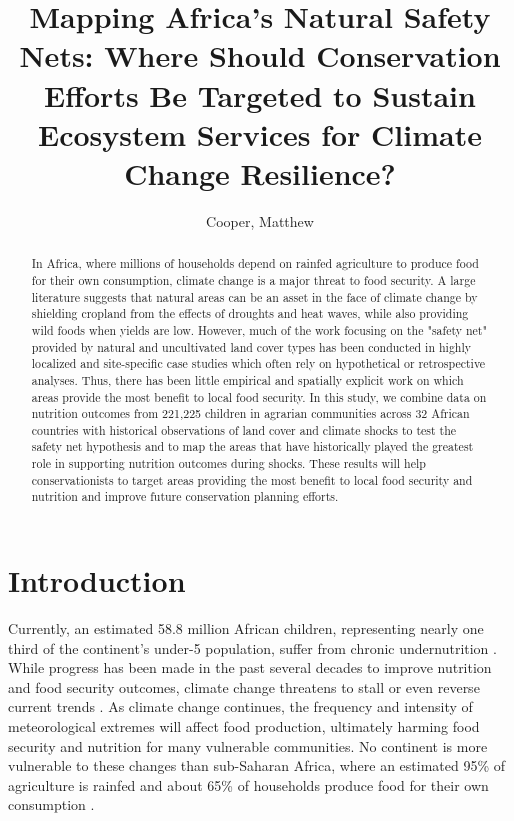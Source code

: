 \documentclass{article}
\begin{document}
\title{Mapping Africa's Natural Safety Nets: Where Should Conservation Efforts Be Targeted to Sustain Ecosystem Services for Climate Change Resilience?}

\author{
	Cooper, Matthew\\
}

\maketitle
\begin{abstract}

In Africa, where millions of households depend on rainfed agriculture to produce food for their own consumption, climate change is a major threat to food security.  A large literature suggests that natural areas can be an asset in the face of climate change by shielding cropland from the effects of droughts and heat waves, while also providing wild foods when yields are low.  However, much of the work focusing on the "safety net" provided by natural and uncultivated land cover types has been conducted in highly localized and site-specific case studies which often rely on hypothetical or retrospective analyses.  Thus, there has been little empirical and spatially explicit work on which areas provide the most benefit to local food security.  In this study, we combine data on nutrition outcomes from 221,225 children in agrarian communities across 32 African countries with historical observations of land cover and climate shocks to test the safety net hypothesis and to map the areas that have historically played the greatest role in supporting nutrition outcomes during shocks.  These results will help conservationists to target areas providing the most benefit to local food security and nutrition and improve future conservation planning efforts.

\end{abstract}

\section{Introduction}

Currently, an estimated 58.8 million African children, representing nearly one third of the continent's under-5 population, suffer from chronic undernutrition \cite{unicef2019}.  While progress has been made in the past several decades to improve nutrition and food security outcomes, climate change threatens to stall or even reverse current trends \cite{FAO2018}.  As climate change continues, the frequency and intensity of meteorological extremes will affect food production, ultimately harming food security and nutrition for many vulnerable communities.  No continent is more vulnerable to these changes than sub-Saharan Africa, where an estimated 95\% of agriculture is rainfed \cite{Wani2009} and about 65\% of households  produce food for their own consumption \cite{Runge2004}.
\end{document}
